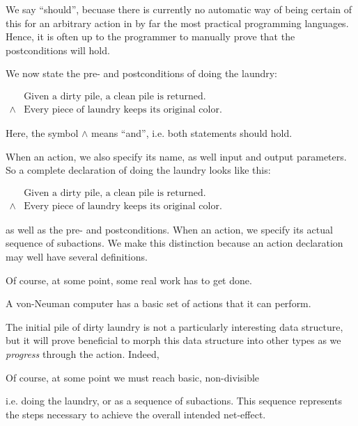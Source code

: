 We say ``should'', becuase there is currently no automatic way of being certain
of this for an arbitrary action in by far the most practical programming
languages. Hence, it is often up to the programmer to manually prove that the
postconditions will hold.

We now state the pre- and postconditions of doing the laundry:

\begin{codebox}
\zi
$\begin{array}{ll}
&\text{Given a dirty pile, a clean pile is returned.}\\
\wedge&\text{Every piece of laundry keeps its original color.}
\end{array}$
\end{codebox}

Here, the symbol $\wedge$ means ``and'', i.e. both statements should hold.

When  an action, we also specify its name, as well input and
output parameters. So a complete declaration of doing the laundry looks like
this:

\begin{codebox}
\zi
$\begin{array}{ll}
&\text{Given a dirty pile, a clean pile is returned.}\\
\wedge&\text{Every piece of laundry keeps its original color.}
\end{array}$
\end{codebox}



as well as the pre- and postconditions. When 
an action, we specify its actual sequence of subactions. We make this
distinction because an action declaration may well have several definitions.

Of course, at some point, some real work has to get done.

A von-Neuman computer has a basic set of actions that it can perform.


The initial pile of dirty laundry is not a particularly interesting data
structure, but it will prove beneficial to morph this data structure into other
types as we \emph{progress} through the action. Indeed, 

Of course, at some point we must reach basic, non-divisible 


 i.e.  doing
the laundry, or as a sequence of subactions. This sequence represents the steps
necessary to achieve the overall intended net-effect.



